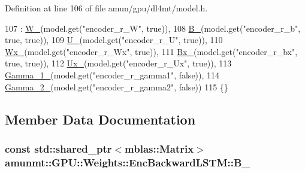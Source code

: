 Definition at line 106 of file amun/gpu/dl4mt/model.\+h.


\begin{DoxyCode}
107     : \hyperlink{structamunmt_1_1GPU_1_1Weights_1_1EncBackwardLSTM_a6b6646ecfb242949e0ee5d0a0d3a60b4}{W\_}(model.get(\textcolor{stringliteral}{"encoder\_r\_W"}, \textcolor{keyword}{true})),
108       \hyperlink{structamunmt_1_1GPU_1_1Weights_1_1EncBackwardLSTM_ab6859f42489b79641bf7689be3f38311}{B\_}(model.get(\textcolor{stringliteral}{"encoder\_r\_b"}, \textcolor{keyword}{true}, \textcolor{keyword}{true})),
109       \hyperlink{structamunmt_1_1GPU_1_1Weights_1_1EncBackwardLSTM_a499c1d7edd9716113ae5882572c890f1}{U\_}(model.get(\textcolor{stringliteral}{"encoder\_r\_U"}, \textcolor{keyword}{true})),
110       \hyperlink{structamunmt_1_1GPU_1_1Weights_1_1EncBackwardLSTM_adb36eb2b67933d70305912cbc40f0a30}{Wx\_}(model.get(\textcolor{stringliteral}{"encoder\_r\_Wx"}, \textcolor{keyword}{true})),
111       \hyperlink{structamunmt_1_1GPU_1_1Weights_1_1EncBackwardLSTM_abb85155bf8cfe781437f871fd24bf6f3}{Bx\_}(model.get(\textcolor{stringliteral}{"encoder\_r\_bx"}, \textcolor{keyword}{true}, \textcolor{keyword}{true})),
112       \hyperlink{structamunmt_1_1GPU_1_1Weights_1_1EncBackwardLSTM_aae6804c97e2a3fce8e28647b5de85ebf}{Ux\_}(model.get(\textcolor{stringliteral}{"encoder\_r\_Ux"}, \textcolor{keyword}{true})),
113       \hyperlink{structamunmt_1_1GPU_1_1Weights_1_1EncBackwardLSTM_a6c3aa1f64727d1223f1ee14c55d86673}{Gamma\_1\_}(model.get(\textcolor{stringliteral}{"encoder\_r\_gamma1"}, \textcolor{keyword}{false})),
114       \hyperlink{structamunmt_1_1GPU_1_1Weights_1_1EncBackwardLSTM_a37952b54d98f1cc98ba5ef18cdd6b2da}{Gamma\_2\_}(model.get(\textcolor{stringliteral}{"encoder\_r\_gamma2"}, \textcolor{keyword}{false}))
115     \{\}
\end{DoxyCode}


\subsection{Member Data Documentation}
\subsubsection[{\texorpdfstring{B\+\_\+}{B_}}]{\setlength{\rightskip}{0pt plus 5cm}const std\+::shared\+\_\+ptr$<${\bf mblas\+::\+Matrix}$>$ amunmt\+::\+G\+P\+U\+::\+Weights\+::\+Enc\+Backward\+L\+S\+T\+M\+::\+B\+\_\+}\hypertarget{structamunmt_1_1GPU_1_1Weights_1_1EncBackwardLSTM_ab6859f42489b79641bf7689be3f38311}{}\label{structamunmt_1_1GPU_1_1Weights_1_1EncBackwardLSTM_ab6859f42489b79641bf7689be3f38311}


